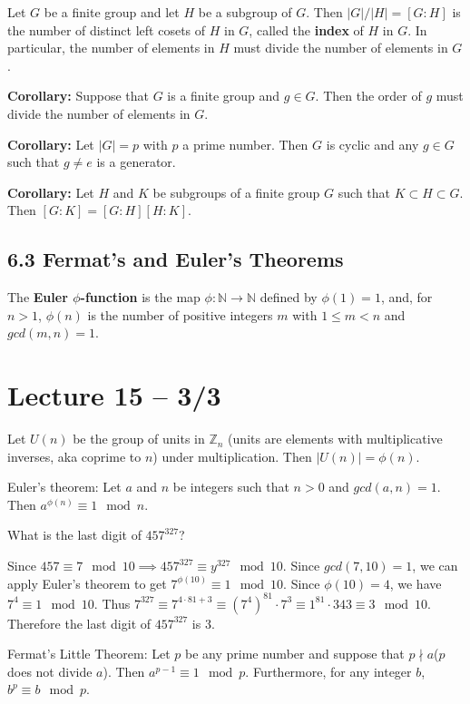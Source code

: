 \documentclass{article}
\newcommand{\N}{\mathbb{N}}
\newcommand{\Z}{\mathbb{Z}}
\begin{document}
\begin{theorem}
  Let $G$ be a finite group and let $H$ be a subgroup of $G$. Then $|G|/|H|=[G:H]$ is the number of distinct left cosets of $H$ in $G$, called the \textbf{index} of $H$ in $G$. In particular, the number of elements in $H$ must divide the number of elements in $G$.
\end{theorem}

\textbf{Corollary:} Suppose that $G$ is a finite group and $g\in G$. Then the order of $g$ must divide the number of elements in $G$.

\textbf{Corollary:} Let $|G|=p$ with $p$ a prime number. Then $G$ is cyclic and any $g\in G$ such that $g\neq e$ is a generator.

\textbf{Corollary:} Let $H$ and $K$ be subgroups of a finite group $G$ such that $K\subset H \subset G$. Then $[G:K]=[G:H][H:K]$.
\subsection{6.3 Fermat's and Euler's Theorems}
The \textbf{Euler $\phi$-function} is the map $\phi:\N\to\N$ defined by $\phi(1)=1$, and, for $n>1$, $\phi(n)$ is the number of positive integers $m$ with $1\leq m<n$ and $gcd(m,n)=1$.

\section{Lecture 15 -- 3/3}
\begin{theorem}
  Let $U(n)$ be the group of units in $\Z_n$ (units are elements with multiplicative inverses, aka coprime to $n$) under multiplication. Then $|U(n)|=\phi(n)$.
\end{theorem}
\begin{theorem}
  Euler's theorem: Let $a$ and $n$ be integers such that $n>0$ and $gcd(a,n)=1$. Then $a^{\phi(n)}\equiv 1\mod n$.
\end{theorem}
\begin{example}
  What is the last digit of $457^{327}$?

  Since $457\equiv 7 \mod 10\implies 457^{327}\equiv y^{327}\mod 10$. Since $gcd(7,10)=1$, we can apply Euler's theorem to get $7^{\phi(10)}\equiv 1\mod 10$. Since $\phi(10)=4$, we have $7^4\equiv 1\mod 10$. Thus $7^{327}\equiv 7^{4\cdot81+3}\equiv (7^4)^{81}\cdot7^3\equiv 1^{81}\cdot343\equiv 3\mod 10$. Therefore the last digit of $457^{327}$ is 3.
\end{example}
\begin{theorem}
  Fermat's Little Theorem: Let $p$ be any prime number and suppose that $p\nmid a$($p$ does not divide $a$). Then $a^{p-1}\equiv 1\mod p$. Furthermore, for any integer $b$, $b^p\equiv b\mod p$.
\end{theorem}
\end{document}
